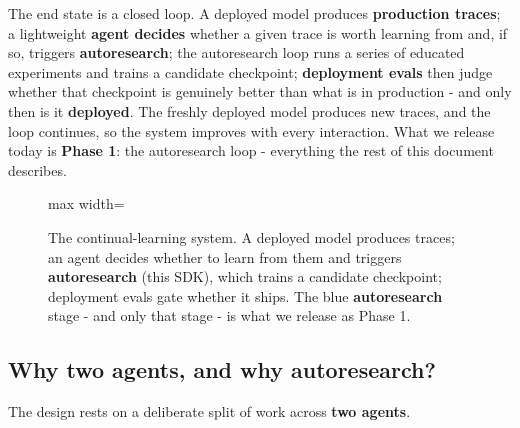 \documentclass[11pt]{article}
\begin{document}
The end state is a closed loop. A deployed model produces \textbf{production
traces}; a lightweight \textbf{agent decides} whether a given trace is worth
learning from and, if so, triggers \textbf{autoresearch}; the autoresearch loop
runs a series of educated experiments and trains a candidate checkpoint;
\textbf{deployment evals} then judge whether that checkpoint is genuinely better
than what is in production - and only then is it \textbf{deployed}. The freshly
deployed model produces new traces, and the loop continues, so the system
improves with every interaction. What we release today is \textbf{Phase 1}: the
autoresearch loop - everything the rest of this document describes.

\begin{figure}[h]
\centering
\begin{adjustbox}{max width=\linewidth}
\end{adjustbox}
\caption{The continual-learning system. A deployed model produces traces; an
agent decides whether to learn from them and triggers \textbf{autoresearch}
(this SDK), which trains a candidate checkpoint; deployment evals gate whether it
ships. The blue \textbf{autoresearch} stage - and only that stage - is what we
release as Phase 1.}
\end{figure}

\subsection{Why two agents, and why autoresearch?}
The design rests on a deliberate split of work across \textbf{two agents}.
\end{document}
